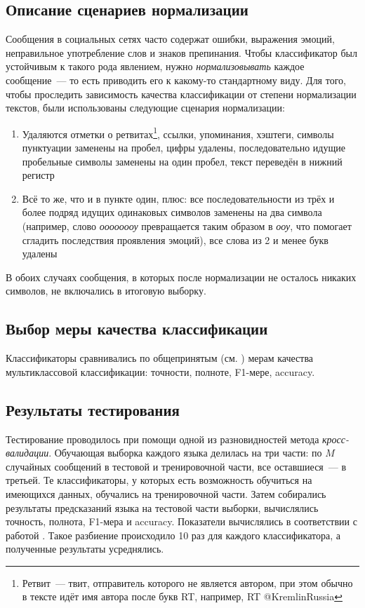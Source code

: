 \documentclass[a4paper, 14pt]{article}
\begin{document}
		\subsection{Описание сценариев нормализации}	
		Сообщения в социальных сетях часто содержат ошибки, выражения эмоций, неправильное употребление слов и знаков препинания. Чтобы классификатор
		был устойчивым к такого рода явлением, нужно \textit{нормализовывать}	 каждое сообщение~--- то есть приводить его к какому-то стандартному виду.
		Для того, чтобы проследить зависимость качества классификации от степени нормализации текстов, были использованы следующие сценария нормализации:
		\begin{enumerate}
			\item Удаляются отметки о ретвитах\footnote{Ретвит~--- твит, отправитель которого не является автором, при этом обычно в тексте идёт имя автора после букв RT, например, RT @KremlinRussia}, ссылки, упоминания, хэштеги, символы пунктуации заменены на пробел, цифры удалены, последовательно идущие пробельные символы заменены на один пробел, текст переведён в нижний регистр
			\item Всё то же, что и в пункте один, плюс: все последовательности из трёх и более подряд идущих одинаковых символов заменены на два символа (например, слово \textit{оооооооу} превращается таким образом в \textit{ооу}, что помогает сгладить последствия проявления эмоций), все слова из 2 и менее букв удалены
		\end{enumerate}
		В обоих случаях сообщения, в которых после нормализации не осталось никаких символов, не включались в итоговую выборку.
		
		
		\subsection{Выбор меры качества классификации}
		Классификаторы сравнивались по общепринятым (см. \cite{multiclass}) мерам качества мультиклассовой классификации: точности, полноте, F1-мере, accuracy.
       
\subsection{Результаты тестирования}
		Тестирование проводилось при помощи одной из разновидностей метода \textit{кросс-валидации}. 
		Обучающая выборка каждого языка делилась на три части: по $M$ случайных сообщений в тестовой и тренировочной части, все оставшиеся~--- в третьей.
		Те классификаторы, у которых есть
		возможность обучиться на имеющихся данных, обучались на тренировочной части. Затем собирались результаты
		предсказаний языка на тестовой части выборки, вычислялись точность, полнота, F1-мера и accuracy. Показатели вычислялись в соответствии с работой \cite{multiclass}. Такое разбиение
		происходило 10 раз для каждого классификатора, а полученные результаты усреднялись.
		
\end{document}
